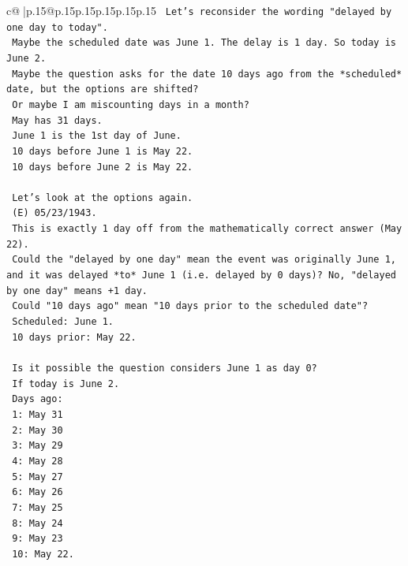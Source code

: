 \documentclass{article}
\begin{document}
{\begin{supertabular}{c@{$\;$}|p{.15\linewidth}@{}p{.15\linewidth}p{.15\linewidth}p{.15\linewidth}p{.15\linewidth}p{.15\linewidth}}
{{{\texttt{    Let's reconsider the wording "delayed by one day to today".} \\
\texttt{    Maybe the scheduled date was June 1. The delay is 1 day. So today is June 2.} \\
\texttt{    Maybe the question asks for the date 10 days ago from the *scheduled* date, but the options are shifted?} \\
\texttt{    Or maybe I am miscounting days in a month?} \\
\texttt{    May has 31 days.} \\
\texttt{    June 1 is the 1st day of June.} \\
\texttt{    10 days before June 1 is May 22.} \\
\texttt{    10 days before June 2 is May 22.} \\
\\ 
\texttt{    Let's look at the options again.} \\
\texttt{    (E) 05/23/1943.} \\
\texttt{    This is exactly 1 day off from the mathematically correct answer (May 22).} \\
\texttt{    Could the "delayed by one day" mean the event was originally June 1, and it was delayed *to* June 1 (i.e. delayed by 0 days)? No, "delayed by one day" means +1 day.} \\
\texttt{    Could "10 days ago" mean "10 days prior to the scheduled date"?} \\
\texttt{    Scheduled: June 1.} \\
\texttt{    10 days prior: May 22.} \\
\\ 
\texttt{    Is it possible the question considers June 1 as day 0?} \\
\texttt{    If today is June 2.} \\
\texttt{    Days ago:} \\
\texttt{    1: May 31} \\
\texttt{    2: May 30} \\
\texttt{    3: May 29} \\
\texttt{    4: May 28} \\
\texttt{    5: May 27} \\
\texttt{    6: May 26} \\
\texttt{    7: May 25} \\
\texttt{    8: May 24} \\
\texttt{    9: May 23} \\
\texttt{    10: May 22.} \\
}}}
\end{supertabular}}
\end{document}
